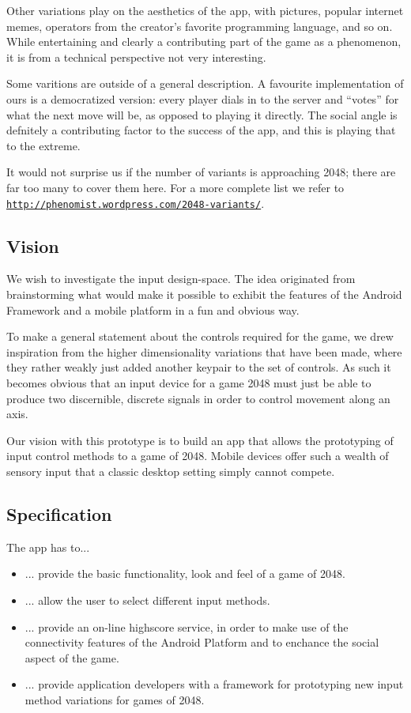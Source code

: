 \documentclass[a4paper, 12pt]{article}
\newcommand{\link}[1]{\href{http://#1}{\texttt{#1}}}
\begin{document}
Other variations play on the aesthetics of the app, with pictures,
popular internet memes, operators from the creator's favorite
programming language, and so on. While entertaining and clearly a
contributing part of the game as a phenomenon, it is from a technical
perspective not very interesting.

Some varitions are outside of a general description. A favourite
implementation of ours is a democratized version: every player dials
in to the server and ``votes'' for what the next move will be, as
opposed to playing it directly. The social angle is defnitely a
contributing factor to the success of the app, and this is playing
that to the extreme.

It would not surprise us if the number of variants is approaching
2048; there are far too many to cover them here. For a more complete
list we refer to \link{http://phenomist.wordpress.com/2048-variants/}.

\subsection{Vision}

We wish to investigate the input design-space. The idea originated
from brainstorming what would make it possible to exhibit the features
of the Android Framework and a mobile platform in a fun and obvious
way.

To make a general statement about the controls required for the game,
we drew inspiration from the higher dimensionality variations that
have been made, where they rather weakly just added another keypair to
the set of controls. As such it becomes obvious that an input device
for a game 2048 must just be able to produce two discernible, discrete
signals in order to control movement along an axis. 

Our vision with this prototype is to build an app that allows the
prototyping of input control methods to a game of 2048. Mobile devices
offer such a wealth of sensory input that a classic desktop setting
simply cannot compete. 

\subsection{Specification}

The app has to...
\begin{itemize}
\item ... provide the basic functionality, look and feel of a game of 2048.
\item ... allow the user to select different input methods.
\item ... provide an on-line highscore service, in order to make use
  of the connectivity features of the Android Platform and to enchance
  the social aspect of the game.
\item ... provide application developers with a framework for
  prototyping new input method variations for games of 2048.
\end{itemize}
\end{document}

